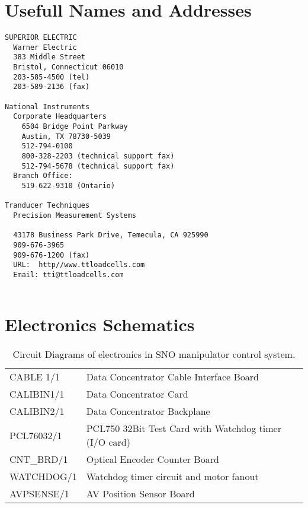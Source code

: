   
  
\chapter{Usefull Names and Addresses}




\begin{verbatim}
SUPERIOR ELECTRIC
  Warner Electric
  383 Middle Street
  Bristol, Connecticut 06010
  203-585-4500 (tel)
  203-589-2136 (fax)
  
National Instruments
  Corporate Headquarters
    6504 Bridge Point Parkway
    Austin, TX 78730-5039
    512-794-0100
    800-328-2203 (technical support fax)
    512-794-5678 (technical support fax)
  Branch Office:
    519-622-9310 (Ontario)
  
Tranducer Techniques
  Precision Measurement Systems
  
  43178 Business Park Drive, Temecula, CA 925990
  909-676-3965
  909-676-1200 (fax)
  URL:  http//www.ttloadcells.com
  Email: tti@ttloadcells.com
  
\end{verbatim}
  
  

\chapter{Electronics Schematics}
  
\begin{table}[htb]
\begin{center}
\begin{tabular}{|l|l|}
\hline
CABLE 1/1   &  Data Concentrator Cable Interface Board\\
CALIBIN1/1  &  Data Concentrator Card\\
CALIBIN2/1  &  Data Concentrator Backplane\\
PCL76032/1  &  PCL750 32Bit Test Card with Watchdog timer (I/O card)\\
CNT\_BRD/1  &  Optical Encoder Counter Board\\
WATCHDOG/1  &  Watchdog timer circuit and motor fanout\\
AVPSENSE/1  &  AV Position Sensor Board\\
\hline
\end{tabular}
\caption[Circuit Diagrams]
        {Circuit Diagrams of electronics in SNO manipulator control system.
        }
\end{center}
\end{table}  


